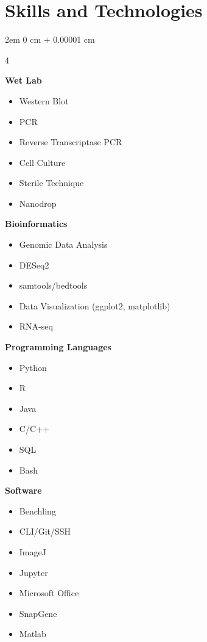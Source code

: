 \documentclass[11pt]{article}
\newcommand{\secrule}{\ \raisebox{0.5ex}{\hrulefill}}
\newenvironment{onecolentry}{
    \begin{adjustwidth}{
        2em
    }{
        0 cm + 0.00001 cm
    }
}{
    \end{adjustwidth}
} %
\begin{document}
\section{Skills and Technologies\secrule}
\begin{onecolentry}
	\begin{paracol}{4}

		\textbf{Wet Lab}
		\begin{itemize}[topsep=0pt, parsep=0pt, partopsep=0pt, itemsep=0pt, leftmargin=8pt]
			\item Western Blot
			\item PCR
			\item Reverse Transcriptase PCR
			\item Cell Culture
			\item Sterile Technique
			\item Nanodrop

		\end{itemize}

		\switchcolumn

		\textbf{Bioinformatics}
		\begin{itemize}[topsep=0pt, parsep=0pt, partopsep=0pt, itemsep=0pt, leftmargin=8pt]
			\item Genomic Data Analysis
			\item DESeq2
			\item samtools/bedtools
			\item Data Visualization (ggplot2, matplotlib)
			\item RNA-seq
		\end{itemize}

		\switchcolumn

		\textbf{Programming Languages}
		\begin{itemize}[topsep=0pt, parsep=0pt, partopsep=0pt, itemsep=0pt, leftmargin=8pt]
			\item Python
			\item R
			\item Java
			\item C/C++
			\item SQL
			\item Bash
		\end{itemize}

		\switchcolumn

		\textbf{Software}
		\begin{itemize}[topsep=0pt, parsep=0pt, partopsep=0pt, itemsep=0pt, leftmargin=8pt]
			\item Benchling
			\item CLI/Git/SSH
			\item ImageJ
			\item Jupyter
\item Microsoft Office 
			\item SnapGene
\item Matlab
		\end{itemize}

	\end{paracol}
\end{onecolentry}
\end{document}
